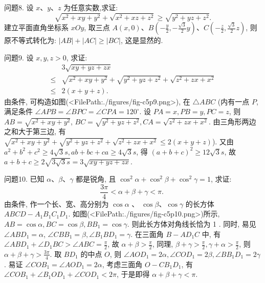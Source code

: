 问题8. 设 $x 、 y 、 z$ 为任意实数,求证:
$$
\sqrt{x^2+x y+y^2}+\sqrt{x^2+x z+z^2} \geqslant \sqrt{y^2+y z+z^2} .
$$
建立平面直角坐标系 $x O y$, 取三点 $A(x, 0) 、 B\left(-\frac{y}{2},-\frac{\sqrt{3}}{2} y\right) 、 C \left(-\frac{z}{2}, \frac{\sqrt{3}}{2} z\right)$, 则原不等式转化为: $|A B|+|A C| \geqslant|B C|$, 这是显然的.



问题9. 设 $x, y, z>0$, 求证:
$$
\begin{aligned}
& 3 \sqrt{x y+y z+z x} \\
\leqslant & \sqrt{x^2+x y+y^2}+\sqrt{y^2+y z+z^2}+\sqrt{z^2+z x+x^2} \\
\leqslant & 2(x+y+z) .
\end{aligned}
$$
由条件, 可构造如图(<FilePath:./figures/fig-c5p9.png>), 在 $\triangle A B C$ (内有一点 $P$, 满足条件 $\angle A P B=\angle B P C=\angle C P A=120^{\circ}$. 设 $P A=x, P B=y, P C=z$, 则 $A B=\sqrt{x^2+x y+y^2}$, $B C=\sqrt{y^2+y z+z^2}, C A=\sqrt{z^2+z x+x^2}$. 
由三角形两边之和大于第三边, 有 $\sqrt{x^2+x y+y^2}+ \sqrt{y^2+y z+z^2}+\sqrt{z^2+z x+x^2} \leqslant 2(x+y+z)$).
又由 $a^2+b^2+c^2 \geqslant 4 \sqrt{3} s, a b+b c+c a \geqslant 4 \sqrt{3} s$,
得 $(a+b+c)^2 \geqslant 12 \sqrt{3} s$, 故 $a+b+c \geqslant 2 \sqrt{3 \sqrt{3} s}=3 \sqrt{x y+y z+z x}$.



问题10. 已知 $\alpha 、 \beta 、 \gamma$ 都是锐角, 且 $\cos ^2 \alpha+\cos ^2 \beta+\cos ^2 \gamma=1$, 求证:
$$
\frac{3 \pi}{4}<\alpha+\beta+\gamma<\pi \text {. }
$$
由条件, 作一个长、宽、高分别为 $\cos \alpha$ 、 $\cos \beta 、 \cos \gamma$ 的长方体 $A B C D-A_1 B_1 C_1 D_1$. 如图(<FilePath:./figures/fig-c5p10.png>)所示, $A B=\cos \alpha, B C=\cos \beta, B B_1=\cos \gamma$. 则此长方体对角线长恰为 1 . 同时, 易见 $\angle A B D_1=\alpha$, $\angle C B B_1=\beta, \angle B_1 B D_1=\gamma$.
在三面角 $B-A D_1 C$ 中, 有 $\angle A B D_1+\angle D_1 B C> \angle A B C=\frac{\pi}{2}$, 故 $\alpha+\beta>\frac{\pi}{2}$, 同理, $\beta+\gamma>\frac{\pi}{2}, \gamma+ \alpha>\frac{\pi}{2}$, 则 $\alpha+\beta+\gamma>\frac{3 \pi}{4}$.
取 $B D_1$ 的中点 $O$, 则 $\angle A O D_1=2 \alpha, \angle C O D_1=2 \beta, \angle B B_1 D_1=2 \gamma$. 易证 $\angle C O B_1=\angle A O D_1=2 \alpha$, 考虑三面角 $O-C B_1 D_1$, 有 $\angle C O B_1+\angle B_1 O D_1+ \angle C O D_1<2 \pi$, 于是即得 $\alpha+\beta+\gamma<\pi$.



